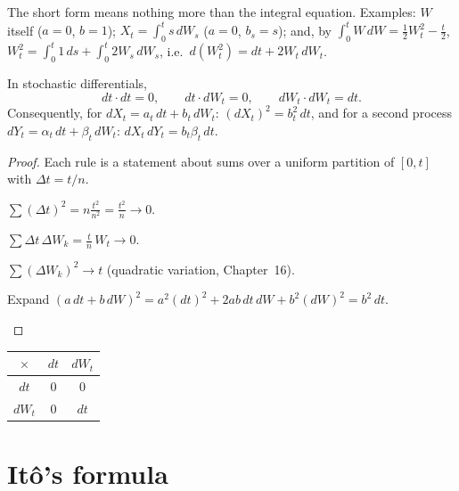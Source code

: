 The short form means nothing more than the integral equation. Examples: $W$ itself ($a=0$, $b=1$); $X_t=\int_0^ts\,dW_s$ ($a=0$, $b_s=s$); and, by $\int_0^tW\,dW=\frac12W_t^2-\frac t2$, $W_t^2=\int_0^t1\,ds+\int_0^t2W_s\,dW_s$, i.e.\ $d(W_t^2)=dt+2W_t\,dW_t$.

\begin{result}
\label{res:table}
In stochastic differentials,
\[
  dt\cdot dt=0,\qquad dt\cdot dW_t=0,\qquad dW_t\cdot dW_t=dt .
\]
Consequently, for $dX_t=a_t\,dt+b_t\,dW_t$: $(dX_t)^2=b_t^2\,dt$, and for a second process $dY_t=\alpha_t\,dt+\beta_t\,dW_t$: $dX_t\,dY_t=b_t\beta_t\,dt$.
\end{result}
\begin{proof}
Each rule is a statement about sums over a uniform partition of $[0,t]$ with $\Delta t=t/n$.
\begin{steps}
  \item $\sum(\Delta t)^2=n\frac{t^2}{n^2}=\frac{t^2}{n}\to0$.
  \item $\sum\Delta t\,\Delta W_k=\frac tn\,W_t\to0$.
  \item $\sum(\Delta W_k)^2\to t$ (quadratic variation, Chapter~16).
  \item Expand $(a\,dt+b\,dW)^2=a^2(dt)^2+2ab\,dt\,dW+b^2(dW)^2=b^2\,dt$. \qedhere
\end{steps}
\end{proof}

\begin{center}
\renewcommand{\arraystretch}{1.3}
\begin{tabular}{@{}c|cc@{}}
$\times$ & $dt$ & $dW_t$ \\ \hline
$dt$ & $0$ & $0$ \\
$dW_t$ & $0$ & $dt$
\end{tabular}
\end{center}

\section{Itô's formula}

